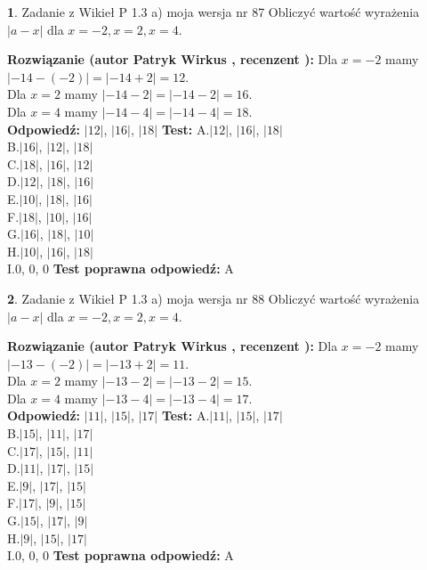\documentclass[12pt, a4paper]{article}
\theoremstyle{definition} %
\newtheorem{zad}{}
\newcommand{\zadStart}[1]{\begin{zad}#1\newline}
\newcommand{\zadStop}{\end{zad}}
\newcommand{\rozwStart}[2]{\noindent \textbf{Rozwiązanie (autor #1 , recenzent #2): }\newline}
\newcommand{\rozwStop}{\newline}
\newcommand{\odpStart}{\noindent \textbf{Odpowiedź:}\newline}
\newcommand{\odpStop}{\newline}
\newcommand{\testStart}{\noindent \textbf{Test:}\newline}
\newcommand{\testStop}{\newline}
\newcommand{\kluczStart}{\noindent \textbf{Test poprawna odpowiedź:}\newline}
\newcommand{\kluczStop}{\newline}
\begin{document}
\zadStart{Zadanie z Wikieł P 1.3 a) moja wersja nr 87}
Obliczyć wartość wyrażenia $|a - x|$ dla $x=-2,x=2,x=4$.
\zadStop
\rozwStart{Patryk Wirkus}{}
Dla $x = -2$ mamy $|-14 - (-2)| = |-14 + 2| = 12$.\\
Dla $x = 2$ mamy $|-14 - 2| = |-14 - 2| = 16$.\\
Dla $x = 4$ mamy $|-14 - 4| = |-14 - 4| = 18$.\\
\rozwStop
\odpStart
$|12|$, $|16|$, $|18|$
\odpStop
\testStart
A.$|12|$, $|16|$, $|18|$\\
B.$|16|$, $|12|$, $|18|$\\
C.$|18|$, $|16|$, $|12|$\\
D.$|12|$, $|18|$, $|16|$\\
E.$|10|$, $|18|$, $|16|$\\
F.$|18|$, $|10|$, $|16|$\\
G.$|16|$, $|18|$, $|10|$\\
H.$|10|$, $|16|$, $|18|$\\
I.$0$, $0$, $0$
\testStop
\kluczStart
A
\kluczStop



\zadStart{Zadanie z Wikieł P 1.3 a) moja wersja nr 88}
Obliczyć wartość wyrażenia $|a - x|$ dla $x=-2,x=2,x=4$.
\zadStop
\rozwStart{Patryk Wirkus}{}
Dla $x = -2$ mamy $|-13 - (-2)| = |-13 + 2| = 11$.\\
Dla $x = 2$ mamy $|-13 - 2| = |-13 - 2| = 15$.\\
Dla $x = 4$ mamy $|-13 - 4| = |-13 - 4| = 17$.\\
\rozwStop
\odpStart
$|11|$, $|15|$, $|17|$
\odpStop
\testStart
A.$|11|$, $|15|$, $|17|$\\
B.$|15|$, $|11|$, $|17|$\\
C.$|17|$, $|15|$, $|11|$\\
D.$|11|$, $|17|$, $|15|$\\
E.$|9|$, $|17|$, $|15|$\\
F.$|17|$, $|9|$, $|15|$\\
G.$|15|$, $|17|$, $|9|$\\
H.$|9|$, $|15|$, $|17|$\\
I.$0$, $0$, $0$
\testStop
\kluczStart
A
\kluczStop
\end{document}
